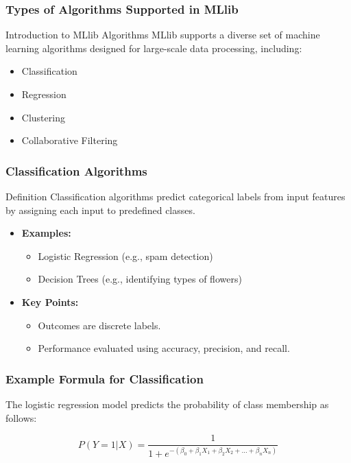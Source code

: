 \documentclass[aspectratio=169]{beamer}
\begin{document}
\begin{frame}[fragile]
    \frametitle{Types of Algorithms Supported in MLlib}
    
    \begin{block}{Introduction to MLlib Algorithms}
        MLlib supports a diverse set of machine learning algorithms designed for large-scale data processing, including:
        \begin{itemize}
            \item Classification
            \item Regression
            \item Clustering
            \item Collaborative Filtering
        \end{itemize}
    \end{block}
\end{frame}

\begin{frame}[fragile]
    \frametitle{Classification Algorithms}

    \begin{block}{Definition}
        Classification algorithms predict categorical labels from input features by assigning each input to predefined classes.
    \end{block}
    
    \begin{itemize}
        \item \textbf{Examples:}
            \begin{itemize}
                \item Logistic Regression (e.g., spam detection)
                \item Decision Trees (e.g., identifying types of flowers)
            \end{itemize}
        
        \item \textbf{Key Points:}
            \begin{itemize}
                \item Outcomes are discrete labels.
                \item Performance evaluated using accuracy, precision, and recall.
            \end{itemize}
    \end{itemize}
\end{frame}

\begin{frame}[fragile]
    \frametitle{Example Formula for Classification}
    
    The logistic regression model predicts the probability of class membership as follows:
    
    \begin{equation}
    P(Y=1|X) = \frac{1}{1 + e^{-(\beta_0 + \beta_1X_1 + \beta_2X_2 + \ldots + \beta_nX_n)}}
    \end{equation}
\end{frame}
\end{document}
